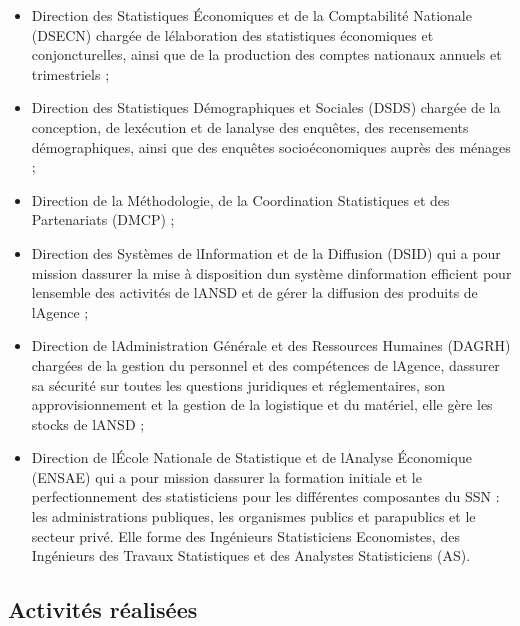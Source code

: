\documentclass[
  letterpaper,
  DIV=11,
  numbers=noendperiod]{scrartcl}
\begin{document}
\begin{itemize}
\item
  Direction des Statistiques Économiques et de la Comptabilité Nationale
  (DSECN) chargée de l\textquotesingle élaboration des statistiques
  économiques et conjoncturelles, ainsi que de la production des comptes
  nationaux annuels et trimestriels ;
\item
  Direction des Statistiques Démographiques et Sociales (DSDS) chargée
  de la conception, de l\textquotesingle exécution et de
  l\textquotesingle analyse des enquêtes, des recensements
  démographiques, ainsi que des enquêtes socioéconomiques auprès des
  ménages ;
\item
  Direction de la Méthodologie, de la Coordination Statistiques et des
  Partenariats (DMCP) ;
\item
  Direction des Systèmes de l\textquotesingle Information et de la
  Diffusion (DSID) qui a pour mission d\textquotesingle assurer la mise
  à disposition d\textquotesingle un système
  d\textquotesingle information efficient pour
  l\textquotesingle ensemble des activités de l\textquotesingle ANSD et
  de gérer la diffusion des produits de l\textquotesingle Agence ;
\item
  Direction de l\textquotesingle Administration Générale et des
  Ressources Humaines (DAGRH) chargées de la gestion du personnel et des
  compétences de l\textquotesingle Agence, d\textquotesingle assurer sa
  sécurité sur toutes les questions juridiques et réglementaires, son
  approvisionnement et la gestion de la logistique et du matériel, elle
  gère les stocks de l\textquotesingle ANSD ;
\item
  Direction de l\textquotesingle École Nationale de Statistique et de
  l\textquotesingle Analyse Économique (ENSAE) qui a pour mission
  d\textquotesingle assurer la formation initiale et le perfectionnement
  des statisticiens pour les différentes composantes du SSN : les
  administrations publiques, les organismes publics et parapublics et le
  secteur privé. Elle forme des Ingénieurs Statisticiens Economistes,
  des Ingénieurs des Travaux Statistiques et des Analystes Statisticiens
  (AS).
\end{itemize}

\hypertarget{activituxe9s-ruxe9alisuxe9es}{%
\subsection{Activités réalisées}\label{activituxe9s-ruxe9alisuxe9es}}
\end{document}
